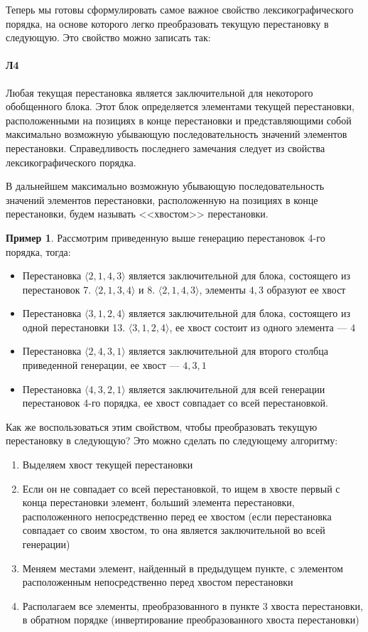\documentclass[12pt,a4paper]{article}
\theoremstyle{plain}
\theoremstyle{definition}
\newtheorem*{example}{Пример}
\theoremstyle{remark}
\begin{document}
Теперь мы готовы сформулировать самое важное свойство лексикографического порядка, на основе которого легко преобразовать текущую перестановку в следующую. Это свойство можно записать так:

\paragraph*{Л4}
\label{L4}
Любая текущая перестановка является заключительной для некоторого обобщенного блока. Этот блок определяется элементами текущей перестановки, расположенными на позициях в конце перестановки и представляющими собой максимально возможную убывающую последовательность значений элементов перестановки. Справедливость последнего замечания следует из свойства~ лексикографического порядка.

В дальнейшем максимально возможную убывающую последовательность значений элементов перестановки, расположенную на позициях в конце перестановки, будем называть <<хвостом>> перестановки.

\begin{example}
Рассмотрим приведенную выше генерацию перестановок 4-го порядка, тогда:

\begin{itemize}
\item Перестановка $\langle 2,1,4,3 \rangle$ является заключительной для блока, состоящего из перестановок 7. $\langle 2,1,3,4 \rangle$ и 8. $\langle 2,1,4,3 \rangle$, элементы $4,3$ образуют ее хвост
\item Перестановка $\langle 3,1,2,4 \rangle$ является заключительной для блока, состоящего из одной перестановки 13. $\langle 3,1,2,4 \rangle$, ее хвост состоит из одного элемента --- $4$
\item Перестановка $\langle 2,4,3,1 \rangle$ является заключительной для второго столбца приведенной генерации, ее хвост --- $4,3,1$
\item Перестановка $\langle 4,3,2,1 \rangle$ является заключительной для всей генерации перестановок 4-го порядка, ее хвост совпадает со всей перестановкой.
\end{itemize}
\end{example}

Как же воспользоваться этим свойством, чтобы преобразовать текущую перестановку в следующую? Это можно сделать по следующему алгоритму:

\begin{enumerate}
\item Выделяем хвост текущей перестановки
\item Если он не совпадает со всей перестановкой, то ищем в хвосте первый с конца перестановки элемент, больший элемента перестановки, расположенного непосредственно перед ее хвостом (если перестановка совпадает со своим хвостом, то она является заключительной во всей генерации)
\item Меняем местами элемент, найденный в предыдущем пункте, с элементом расположенным непосредственно перед хвостом перестановки
\item Располагаем все элементы, преобразованного в пункте 3 хвоста перестановки, в обратном порядке (инвертирование преобразованного хвоста перестановки)
\end{enumerate}
\end{document}
